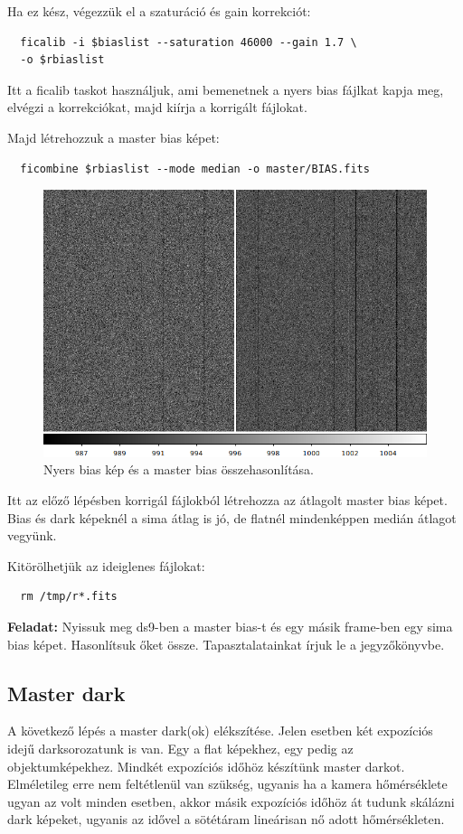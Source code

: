 \documentclass{article}
\begin{document}
Ha ez kész, végezzük el a szaturáció és gain korrekciót:
\begin{verbatim}
  ficalib -i $biaslist --saturation 46000 --gain 1.7 \
  -o $rbiaslist
\end{verbatim}

Itt a ficalib taskot használjuk, ami bemenetnek a nyers bias fájlkat kapja meg,
elvégzi a korrekciókat, majd kiírja a korrigált fájlokat.

Majd létrehozzuk a master bias képet:
\begin{verbatim}
  ficombine $rbiaslist --mode median -o master/BIAS.fits
\end{verbatim}

\begin{figure}[ht!]
    \centering
    \includegraphics[width=0.8\linewidth]{pics/biascomp.png}
    \caption{Nyers bias kép és a master bias összehasonlítása.}
    \label{biascomp}
\end{figure}

Itt az előző lépésben korrigál fájlokból létrehozza az átlagolt master bias
képet. Bias és dark képeknél a sima átlag is jó, de flatnél mindenképpen medián
átlagot vegyünk.

Kitörölhetjük az ideiglenes fájlokat:
\begin{verbatim}
  rm /tmp/r*.fits
\end{verbatim}

{\bf Feladat:}
Nyissuk meg ds9-ben a master bias-t és egy másik frame-ben egy sima bias képet.
Hasonlítsuk őket össze. Tapasztalatainkat írjuk le a jegyzőkönyvbe.


\subsection{Master dark}

A következő lépés a master dark(ok) elékszítése. Jelen esetben két expozíciós
idejű darksorozatunk is van. Egy a flat képekhez, egy pedig az objektumképekhez.
Mindkét expozíciós időhöz készítünk master darkot. Elméletileg erre nem
feltétlenül van szükség, ugyanis ha a kamera hőmérséklete ugyan az volt minden
esetben, akkor másik expozíciós időhöz át tudunk skálázni dark képeket, ugyanis
az idővel a sötétáram lineárisan nő adott hőmérsékleten.
\end{document}
